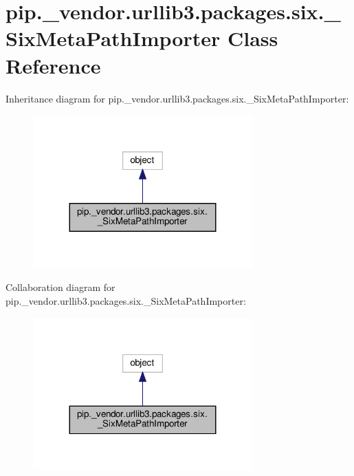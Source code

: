 \hypertarget{classpip_1_1__vendor_1_1urllib3_1_1packages_1_1six_1_1__SixMetaPathImporter}{}\section{pip.\+\_\+vendor.\+urllib3.\+packages.\+six.\+\_\+\+Six\+Meta\+Path\+Importer Class Reference}
\label{classpip_1_1__vendor_1_1urllib3_1_1packages_1_1six_1_1__SixMetaPathImporter}


Inheritance diagram for pip.\+\_\+vendor.\+urllib3.\+packages.\+six.\+\_\+\+Six\+Meta\+Path\+Importer\+:
\nopagebreak
\begin{figure}[H]
\begin{center}
\leavevmode
\includegraphics[width=239pt]{classpip_1_1__vendor_1_1urllib3_1_1packages_1_1six_1_1__SixMetaPathImporter__inherit__graph}
\end{center}
\end{figure}


Collaboration diagram for pip.\+\_\+vendor.\+urllib3.\+packages.\+six.\+\_\+\+Six\+Meta\+Path\+Importer\+:
\nopagebreak
\begin{figure}[H]
\begin{center}
\leavevmode
\includegraphics[width=239pt]{classpip_1_1__vendor_1_1urllib3_1_1packages_1_1six_1_1__SixMetaPathImporter__coll__graph}
\end{center}
\end{figure}
